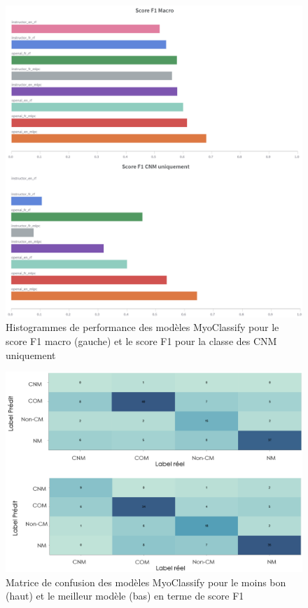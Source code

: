 \begin{figure}[htbp]
  \centering
  \includegraphics[width=1\textwidth]{figures/histo_myoclassify.png}
  \caption[Histogrammes de performance des modèles MyoClassify]{Histogrammes de performance des modèles MyoClassify pour le score F1 macro (gauche) et le score F1 pour la classe des CNM uniquement}
  \label{fig:myoclassify_histo}
\end{figure}
\begin{figure}[htbp]
  \centering
  \includegraphics[width=1\textwidth]{figures/matrix_conf_myoclassify.png}
  \caption[Matrice de confusion MyoClassify]{Matrice de confusion des modèles MyoClassify pour le moins bon (haut) et le meilleur modèle (bas) en terme de score F1}
  \label{fig:myoclassify_conf}
\end{figure}

